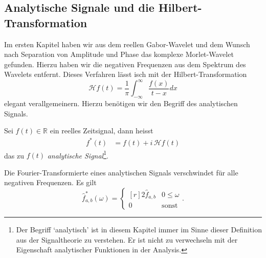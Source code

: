 \subsection{Analytische Signale und die Hilbert-Transformation}
Im ersten Kapitel haben wir aus dem reellen Gabor-Wavelet und dem Wunsch nach Separation von Amplitude und Phase das komplexe Morlet-Wavelet gefunden.
Hierzu haben wir die negativen Frequenzen aus dem Spektrum des Wavelets entfernt.
Dieses Verfahren lässt isch mit der Hilbert-Transformation
\[
	\mathcal{H}f(t) =
	\frac{1}{\pi}\int_{-\infty}^{\infty}\frac{f(x)}{t-x} dx
\]
elegant verallgemeinern.
Hierzu benötigen wir den Begriff des analytischen Signals.
\begin{definition}
	Sei $f(t) \in \mathbb{R}$ ein reelles Zeitsignal, dann heisst
	\begin{align*}
		f^\ast(t) 
		&= f(t) + i\,\mathcal{H}f(t)
	\end{align*}
	das zu $f(t)$ \emph{analytische Signal}\footnote{Der Begriff `analytisch' ist in diesem Kapitel immer im Sinne dieser Definition aus der Signaltheorie zu verstehen.
	Er ist nicht zu verwechseln mit der Eigenschaft analytischer Funktionen in der Analysis.
	}.
\end{definition}

\begin{satz}
	Die Fourier-Transformierte eines analytischen Signals verschwindet für alle negativen Frequenzen.
	Es gilt
	\[
		\hat{f}^\ast_{a,b}(\omega) = \left\lbrace\begin{matrix*}[r]	
			2\hat{f}_{a,b} & 0 \le \omega \\ 0 & \text{sonst}\end{matrix*} \right..
	\]
\end{satz}

